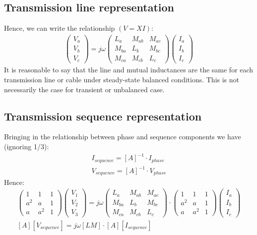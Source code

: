 \subsection{Transmission line representation}
Hence, we can write the relationship $(V = XI)$:
\begin{gather}
	\begin{pmatrix}
		V_a \\
		V_b \\
		V_c
	\end{pmatrix} = j \omega \begin{pmatrix}
		L_a    & M_{ab} & M_{ac} \\
		M_{ba} & L_b    & M_{bc} \\
		M_{ca} & M_{cb} & L_c
	\end{pmatrix}\begin{pmatrix}
		I_a \\
		I_b \\
		I_c
	\end{pmatrix}
\end{gather}
It is reasonable to say that the line and mutual inductances are the same for each transmission line or cable under steady-state balanced conditions. This is not necessarily the case for transient or unbalanced case.
\subsection{Transmission sequence representation}
Bringing in the relationship between phase and sequence components we have (ignoring 1/3):
\begin{gather}
	I_{sequence} = \left[A\right]^{-1} \cdot I_{phase}\\
	V_{sequence} = \left[A\right]^{-1} \cdot V_{phase}
\end{gather}
Hence:
\begin{gather}
	\begin{pmatrix}
		1   & 1   & 1 \\
		a^2 & a   & 1 \\
		a   & a^2 & 1
	\end{pmatrix}\begin{pmatrix}
		V_1 \\
		V_2 \\
		V_3
	\end{pmatrix} = j\omega\begin{pmatrix}
		L_a    & M_{ab} & M_{ac} \\
		M_{ba} & L_b    & M_{bc} \\
		M_{ca} & M_{cb} & L_c
	\end{pmatrix}\cdot\begin{pmatrix}
		1   & 1   & 1 \\
		a^2 & a   & 1 \\
		a   & a^2 & 1
	\end{pmatrix}\begin{pmatrix}
		I_a \\
		I_b \\
		I_c
	\end{pmatrix}\\
	\left[A\right] \left[V_{sequence}\right] = j\omega \left[LM\right]\cdot \left[A\right]\left[I_{sequence}\right]
\end{gather}
